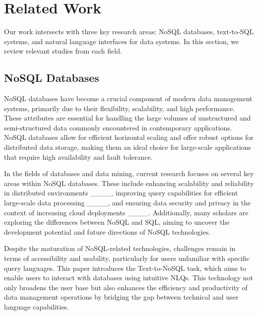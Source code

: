 \section{Related Work}
\label{sec:related_work}

Our work intersects with three key research areas: NoSQL databases, text-to-SQL systems, and natural language interfaces for data systems. In this section, we review relevant studies from each field.

\subsection{NoSQL Databases}
NoSQL databases have become a crucial component of modern data management systems, primarily due to their flexibility, scalability, and high performance. These attributes are essential for handling the large volumes of unstructured and semi-structured data commonly encountered in contemporary applications. NoSQL databases allow for efficient horizontal scaling and offer robust options for distributed data storage, making them an ideal choice for large-scale applications that require high availability and fault tolerance.

In the fields of databases and data mining, current research focuses on several key areas within NoSQL databases. These include enhancing scalability and reliability in distributed environments ____, improving query capabilities for efficient large-scale data processing ____, and ensuring data security and privacy in the context of increasing cloud deployments ____. Additionally, many scholars are exploring the differences between NoSQL and SQL, aiming to uncover the development potential and future directions of NoSQL technologies.

Despite the maturation of NoSQL-related technologies, challenges remain in terms of accessibility and usability, particularly for users unfamiliar with specific query languages. This paper introduces the Text-to-NoSQL task, which aims to enable users to interact with databases using intuitive NLQs. This technology not only broadens the user base but also enhances the efficiency and productivity of data management operations by bridging the gap between technical and user language capabilities.

\vspace{-5pt}
